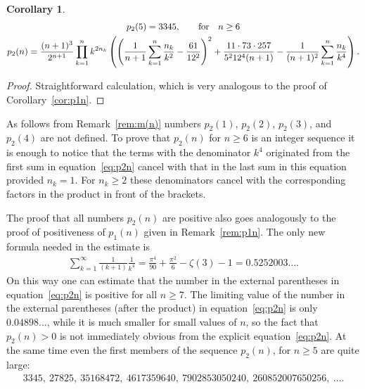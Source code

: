 \documentclass[pdftex]{sigma}
\numberwithin{equation}{section}
\newtheorem{Corollary}[Theorem]{Corollary}
\begin{document}
\begin{Corollary}\label{cor:p2n}
\begin{gather}
p_2(5) =3345,\qquad{\rm for} \quad n\geq6 \label{eq:p2n}\\
p_2(n) =\frac{(n+1)^3}{2^{n+1}}\prod\limits_{k=1}^n k^{2n_k} \left( \left(
\frac{1}{n+1}\sum\limits_{k=1}^n\frac{n_k}{k^2}-\frac{61}{12^2}\right)^2 +
\frac{11\cdot73\cdot257}{5^212^4(n+1)}-\frac{1}{(n+1)^2}\sum\limits_{k=1}^n\frac{n_k}{k^4}\right).\nonumber
\end{gather}
\end{Corollary}
\begin{proof}Straightforward calculation, which is very analogous to the proof of Corollary~\ref{cor:p1n}.
\end{proof}

\begin{Remark}As follows from Remark~\ref{rem:m(n)} numbers $p_2(1)$, $p_2(2)$, $p_2(3)$, and $p_2(4)$ are not defined.
To prove that $p_2(n)$ for $n\geq6$ is an integer sequence it is enough to notice that the terms with the
denominator $k^4$ originated from the first sum in equation~\eqref{eq:p2n} cancel with that in the last sum in
this equation provided $n_k=1$. For $n_k\geq2$ these denominators cancel with the corresponding factors in
the product in front of the brackets.

The proof that all numbers $p_2(n)$ are positive also goes analogously to the proof of positiveness of $p_1(n)$
given in Remark~\ref{rem:p1n}. The only new formula needed in the estimate is
\begin{gather*}
\sum\limits_{k=1}^{\infty}\frac{1}{(k+1)} \frac{1}{k^4}=\frac{\pi^4}{90}+\frac{\pi^2}{6}-\zeta(3)-1=0.5252003\ldots.
\end{gather*}
On this way one can estimate that the number in the external parentheses in equation~\eqref{eq:p2n} is positive for all $n\geq7$.
The limiting value of the number in the external parentheses (after the product) in equation~\eqref{eq:p2n} is only $0.04898\ldots$,
while it is much smaller for small values of $n$, so the fact that $p_2(n)>0$ is not immediately obvious from the explicit
equation~\eqref{eq:p2n}. At the same time even the first members of the sequence $p_2(n)$, for $n\geq5$ are quite large:
\begin{gather*}
3345, \ 27825, \ 35168472, \ 4617359640, \ 7902853050240, \ 260852007650256, \ \ldots.
\end{gather*}
\end{Remark}
\end{document}
